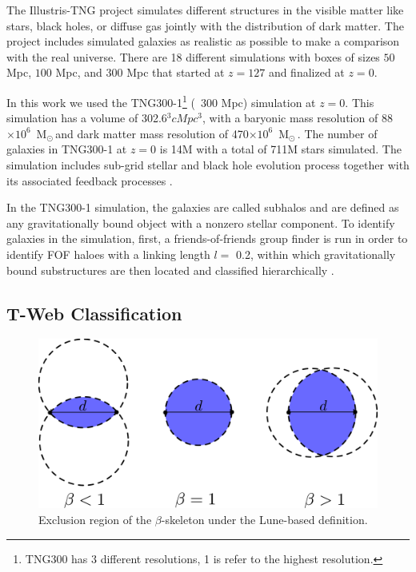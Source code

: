 \documentclass[usenatbib]{mnras}
\newcommand{\Msun}{\,{\rm M}$_{\odot}$\,}
\begin{document}
The Illustris-TNG project simulates different structures in the visible matter like stars, black holes, or diffuse gas jointly with the distribution of dark matter.
The project includes simulated galaxies as realistic as possible to
make a comparison with the real universe. There are 18 different
simulations with boxes of sizes $50$ Mpc, $100$ Mpc, and $300$ Mpc that started at $z=127$ and finalized at $z=0$.    

In this work we used the TNG300-1\footnote{TNG300 has 3 different resolutions, 1 is refer to the highest resolution.}  (~300 Mpc) simulation at $z=0$.
This simulation has a volume of 302.6$^3 cMpc^3$, with a baryonic mass resolution of 88$\times 10^{6}$ \Msun  and dark matter mass resolution of 470$\times  10^{6}$ \Msun \citep{Nelson2019}.
The number of galaxies in TNG300-1 at $z=0$ is 14M 
with a total of 711M stars simulated. 
The simulation includes sub-grid stellar and black hole evolution process together with its associated 
feedback processes \citep{Nelson2019,Pillepich2018a,Springel2018}.

In the TNG300-1 simulation, the galaxies are called subhalos and are defined as any gravitationally
bound object with a nonzero
stellar component.
To identify galaxies in the simulation,
first, a friends-of-friends group finder is run
in order to identify FOF haloes with
a linking length $l=$ 0.2,
within which gravitationally bound substructures
are then located and classified hierarchically \citep{Pillepich2018a}.
 
\subsection{T-Web Classification}

\begin{figure}
\centering
 \includegraphics[scale=0.18]{Figs/p_beta.pdf}
 \caption{Exclusion region of the $\beta$-skeleton under the Lune-based definition.}  
 \label{fig:beta}
\end{figure}
\end{document}
